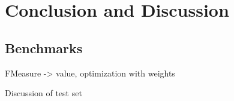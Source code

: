 %
\section{Conclusion and Discussion}
\label{sec_conclusion}

\subsection{Benchmarks}
FMeasure -> value, optimization with weights


Discussion of test set